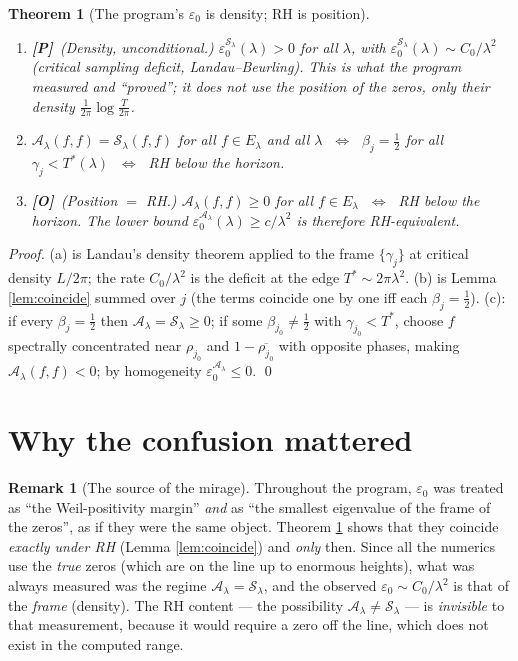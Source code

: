 \documentclass[11pt]{article}
\newcommand{\PR}{\textcolor{green!55!black}{\textbf{[P]}}}
\newcommand{\OP}{\textcolor{red!75!black}{\textbf{[O]}}}
\theoremstyle{plain}
\newtheorem{theorem}{Theorem}
\theoremstyle{definition}
\newtheorem{remark}{Remark}
\newcommand{\half}{\tfrac12}
\newcommand{\El}{E_\lambda}
\newcommand{\Sframe}{\mathcal S_\lambda}
\newcommand{\Aweil}{\mathcal A_\lambda}
\begin{document}
\begin{theorem}[The program's $\varepsilon_0$ is density; RH is position]
\label{thm:verdict}
\begin{enumerate}[label=\textbf{(\alph*)},leftmargin=2em]
\item \PR\ \emph{(Density, unconditional.)} $\varepsilon_0^{\Sframe}(\lambda)>0$ for
all $\lambda$, with $\varepsilon_0^{\Sframe}(\lambda)\sim C_0/\lambda^2$ (critical
sampling deficit, Landau--Beurling). \emph{This is what the program measured and
``proved''}; it does not use the position of the zeros, only their density
$\tfrac1{2\pi}\log\tfrac{T}{2\pi}$.
\item $\Aweil(f,f)=\Sframe(f,f)$ for all $f\in\El$ and all $\lambda$
$\;\Longleftrightarrow\;$ $\beta_j=\half$ for all $\gamma_j<T^*(\lambda)$
$\;\Longleftrightarrow\;$ RH below the horizon.
\item \OP\ \emph{(Position $=$ RH.)} $\Aweil(f,f)\ge0$ for all $f\in\El$
$\;\Longleftrightarrow\;$ RH below the horizon. The lower bound
$\varepsilon_0^{\Aweil}(\lambda)\ge c/\lambda^2$ is therefore RH-equivalent.
\end{enumerate}
\end{theorem}
\begin{proof}
(a) is Landau's density theorem applied to the frame $\{\gamma_j\}$ at critical
density $L/2\pi$; the rate $C_0/\lambda^2$ is the deficit at the edge
$T^*\sim2\pi\lambda^2$. (b) is Lemma \ref{lem:coincide} summed over $j$ (the
terms coincide one by one iff each $\beta_j=\half$). (c): if every $\beta_j=\half$
then $\Aweil=\Sframe\ge0$; if some $\beta_{j_0}\ne\half$ with $\gamma_{j_0}<T^*$,
choose $f$ spectrally concentrated near $\rho_{j_0}$ and $1-\overline{\rho_{j_0}}$
with opposite phases, making $\Aweil(f,f)<0$; by homogeneity
$\varepsilon_0^{\Aweil}\le0$. \qed
\end{proof}

\section{Why the confusion mattered}\label{sec:confusion}

\begin{remark}[The source of the mirage]
Throughout the program, $\varepsilon_0$ was treated as ``the Weil-positivity
margin'' \emph{and} as ``the smallest eigenvalue of the frame of the zeros'', as if
they were the same object. Theorem \ref{thm:verdict} shows that they coincide
\emph{exactly under RH} (Lemma \ref{lem:coincide}) and \emph{only} then. Since all
the numerics use the \emph{true} zeros (which are on the line up to enormous
heights), what was always measured was the regime $\Aweil=\Sframe$, and the observed
$\varepsilon_0\sim C_0/\lambda^2$ is that of the \emph{frame} (density). The RH
content --- the possibility $\Aweil\ne\Sframe$ --- is \emph{invisible} to that
measurement, because it would require a zero off the line, which does not exist in
the computed range.
\end{remark}
\end{document}
